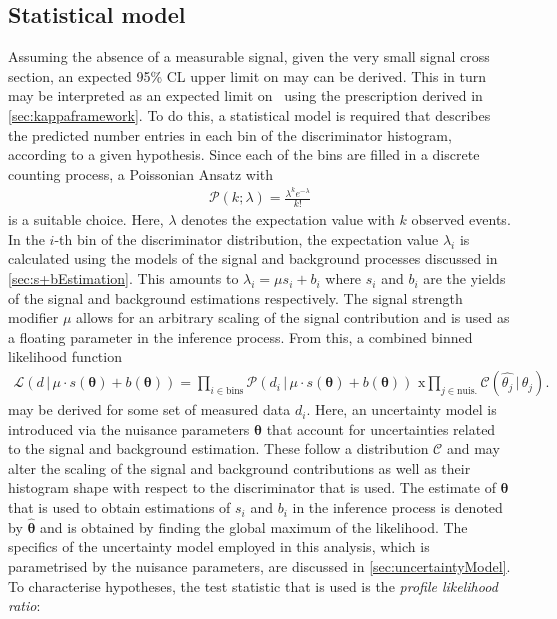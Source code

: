 \subsection{Statistical model}
\label{sec:statisticalModel}
Assuming the absence of a measurable signal, given the very small signal cross section, an expected 95\% CL upper limit on \sBR may can be derived. This in turn may be interpreted as an expected limit on \kappac \, using the prescription derived in \autoref{sec:kappaframework}. To do this, a statistical model is required that describes the predicted number entries in each bin of the discriminator histogram, according to a given hypothesis. Since each of the bins are filled in a discrete counting process, a Poissonian Ansatz with 
\begin{align}
    \mathcal{P}(k; \lambda) = \frac{\lambda^{k} e^{-\lambda}}{k!}
\end{align}
is a suitable choice. Here, $\lambda$ denotes the expectation value with $k$ observed events. In the $i$-th bin of the discriminator distribution, the expectation value $\lambda_i$ is calculated using the models of the signal and background processes discussed in \autoref{sec:s+bEstimation}. This amounts to $\lambda_i = \mu s_i + b_i$ where $s_i$ and $b_i$ are the yields of the signal and background estimations respectively. The signal strength modifier $\mu$ allows for an arbitrary scaling of the signal contribution and is used as a floating parameter in the inference process. From this, a combined binned likelihood function 
\begin{align}
    \label{binned_likelihood}
    \mathcal{L} (d \, | \, \mu \cdot s(\bm{\theta}) + b(\bm{\theta})) = \prod_{i \in \mathrm{bins}} \mathcal{P}(d_i \, | \, \mu \cdot s(\bm{\theta}) + b(\bm{\theta})) \, \,  \mathrm{x} \prod_{j \in \mathrm{nuis.}} \mathcal{C} ({\hat{\theta_j}} \, | \, \theta_j).
\end{align}
may be derived for some set of measured data $d_i$. Here, an uncertainty model is introduced via the nuisance parameters $\bm{\theta}$ that account for uncertainties related to the signal and background estimation. These follow a distribution $\mathcal{C}$ and may alter the scaling of the signal and background contributions as well as their histogram shape with respect to the discriminator that is used. The estimate of $\bm{\theta}$ that is used to obtain estimations of $s_i$ and $b_i$ in the inference process is denoted by $\bm{\hat{\theta}}$ and is obtained by finding the global maximum of the likelihood. The specifics of the uncertainty model employed in this analysis, which is parametrised by the nuisance parameters, are discussed in \autoref{sec:uncertaintyModel}. To characterise hypotheses, the test statistic that is used is the \textit{profile likelihood ratio}:
